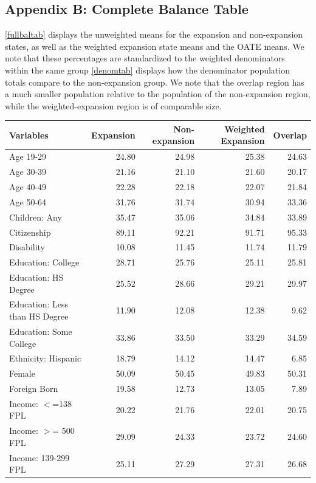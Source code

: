 \documentclass[12pt]{article}
\begin{document}
\subsection{Appendix B: Complete Balance Table}

\ref{fullbaltab} displays the unweighted means for the expansion and non-expansion states, as well as the weighted expansion state means and the OATE means. We note that these percentages are standardized to the weighted denominators within the same group \ref{denomtab} displays how the denominator population totals compare to the non-expansion group. We note that the overlap region has a much smaller population relative to the population of the non-expansion region, while the weighted-expansion region is of comparable size.

\begin{table}[ht]
\centering
\begin{tabular}{lrrrr}
  \hline
Variables & Expansion & Non-expansion & Weighted Expansion & Overlap \\ 
  \hline
Age 19-29 & 24.80 & 24.98 & 25.38 & 24.63 \\ 
  Age 30-39 & 21.16 & 21.10 & 21.60 & 20.17 \\ 
  Age 40-49 & 22.28 & 22.18 & 22.07 & 21.84 \\ 
  Age 50-64 & 31.76 & 31.74 & 30.94 & 33.36 \\ 
  Children: Any & 35.47 & 35.06 & 34.84 & 33.89 \\ 
  Citizenship & 89.11 & 92.21 & 91.71 & 95.33 \\ 
  Disability & 10.08 & 11.45 & 11.74 & 11.79 \\ 
  Education: College & 28.71 & 25.76 & 25.11 & 25.81 \\ 
  Education: HS Degree & 25.52 & 28.66 & 29.21 & 29.97 \\ 
  Education: Less than HS Degree & 11.90 & 12.08 & 12.38 & 9.62 \\ 
  Education: Some College & 33.86 & 33.50 & 33.29 & 34.59 \\ 
  Ethnicity: Hispanic & 18.79 & 14.12 & 14.47 & 6.85 \\ 
  Female & 50.09 & 50.45 & 49.83 & 50.31 \\ 
  Foreign Born & 19.58 & 12.73 & 13.05 & 7.89 \\ 
  Income: $<$=138 FPL & 20.22 & 21.76 & 22.01 & 20.75 \\ 
  Income: $>$= 500 FPL & 29.09 & 24.33 & 23.72 & 24.60 \\ 
  Income: 139-299 FPL & 25.11 & 27.29 & 27.31 & 26.68 \\ 

\end{tabular}
\end{table}
\end{document}
